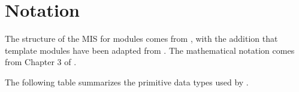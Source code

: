 \documentclass[12pt, titlepage]{article}
\begin{document}
\section{Notation}


The structure of the MIS for modules comes from \citet{HoffmanAndStrooper1995},
with the addition that template modules have been adapted from
\cite{GhezziEtAl2003}.  The mathematical notation comes from Chapter 3 of
\citet{HoffmanAndStrooper1995}.  

The following table summarizes the primitive data types used by \progname. 
\end{document}
